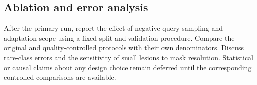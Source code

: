 \subsection{Ablation and error analysis}
After the primary run, report the effect of negative-query sampling and adaptation scope using a fixed split and validation procedure. Compare the original and quality-controlled protocols with their own denominators. Discuss rare-class errors and the sensitivity of small lesions to mask resolution. Statistical or causal claims about any design choice remain deferred until the corresponding controlled comparisons are available.
